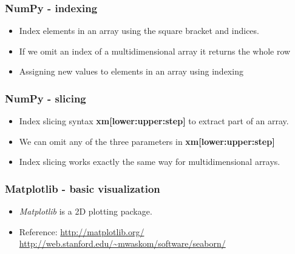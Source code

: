 \documentclass[11pt]{beamer}
\begin{document}
%
\begin{frame}[plain]
    \frametitle{NumPy - indexing}
    \begin{itemize}
        \item[] Index elements in an array using the square bracket and indices. 
        
        
        \item[] If we omit an index of a multidimensional array it returns the whole row
        
        \item[] Assigning new values to elements in an array using indexing
        
    \end{itemize}
\end{frame}
%
\begin{frame}[plain]
    \frametitle{NumPy - slicing}
    \begin{itemize}
        \item[] Index slicing syntax \textbf{xm[lower:upper:step]} to extract part of an array. 
        
        \item[] We can omit any of the three parameters in \textbf{xm[lower:upper:step]}
        
        \item[] Index slicing works exactly the same way for multidimensional arrays.
        
    \end{itemize}
\end{frame}
%
\begin{frame}[plain]
    \frametitle{Matplotlib - basic visualization}
    \begin{itemize}
        \item[] \textit{Matplotlib} is a 2D plotting package.  
        
        
        \item[] Reference: \url{http://matplotlib.org/}\\
        \url{http://web.stanford.edu/~mwaskom/software/seaborn/}
    \end{itemize}
\end{frame}
%
\end{document}
